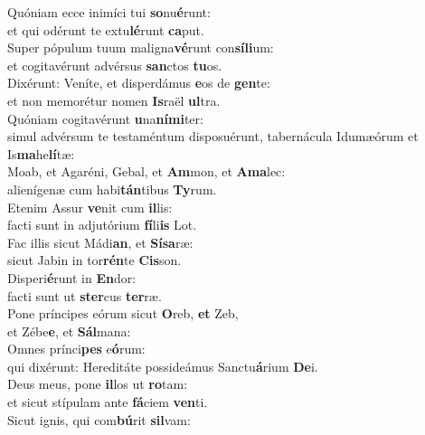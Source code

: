 \evenverse Quóniam ecce inimíci tui \textbf{so}nu\textbf{é}runt:~\*\\
\evenverse et qui odérunt te extu\textbf{lé}runt \textbf{ca}put.\\
\oddverse Super pópulum tuum maligna\textbf{vé}runt con\textbf{sí}\textbf{li}um:~\*\\
\oddverse et cogitavérunt advérsus \textbf{san}ctos \textbf{tu}os.\\
\evenverse Dixérunt: Veníte, et disperdámus \textbf{e}os de \textbf{gen}te:~\*\\
\evenverse et non memorétur nomen \textbf{Is}raël \textbf{ul}tra.\\
\oddverse Quóniam cogitavérunt \textbf{u}na\textbf{ní}\textbf{mi}ter:~\*\\
\oddverse simul advérsum te testaméntum disposuérunt, tabernácula Idumæórum et Is\textbf{ma}he\textbf{lí}tæ:\\
\evenverse Moab, et Agaréni, Gebal, et \textbf{Am}mon, et \textbf{A}\textbf{ma}lec:~\*\\
\evenverse alienígenæ cum habi\textbf{tán}tibus \textbf{Ty}rum.\\
\oddverse Etenim Assur \textbf{ve}nit cum \textbf{il}lis:~\*\\
\oddverse facti sunt in adjutórium \textbf{fí}li\textbf{is} Lot.\\
\evenverse Fac illis sicut Mádi\textbf{an}, et \textbf{Sí}\textbf{sa}ræ:~\*\\
\evenverse sicut Jabin in tor\textbf{rén}te \textbf{Cis}son.\\
\oddverse Disperi\textbf{é}runt in \textbf{En}dor:~\*\\
\oddverse facti sunt ut \textbf{ster}cus \textbf{ter}ræ.\\
\evenverse Pone príncipes eórum sicut \textbf{O}reb, \textbf{et} Zeb,~\*\\
\evenverse et Zébe\textbf{e}, et \textbf{Sál}mana:\\
\oddverse Omnes prínci\textbf{pes} e\textbf{ó}rum:~\*\\
\oddverse qui dixérunt: Hereditáte possideámus Sanctu\textbf{á}rium \textbf{De}i.\\
\evenverse Deus meus, pone \textbf{il}los ut \textbf{ro}tam:~\*\\
\evenverse et sicut stípulam ante \textbf{fá}ciem \textbf{ven}ti.\\
\oddverse Sicut ignis, qui com\textbf{bú}rit \textbf{sil}vam:~\*\\
